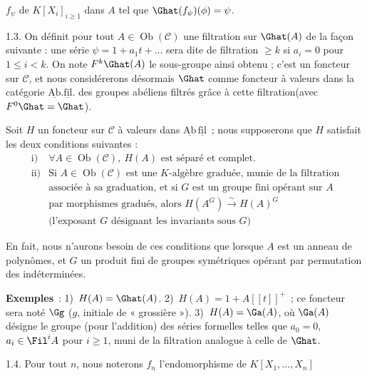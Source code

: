 
\(f_\psi\) de \(K[X_i]_{i\geq 1}\) dans \(A\) tel que \(\Ghat(f_\psi)(\phi)=\psi\).

1.3. On définit pour tout \(A\in\operatorname{Ob}(\mathcal C)\) une filtration sur \(\Ghat(A)\) de la façon suivante : une série \(\psi=1+a_1t+\ldots\) sera dite de filtration \(\geq k\) si \(a_i=0\) pour \(1\leq i<k\). On note \(F^k\Ghat(A)\) le sous-groupe ainsi obtenu ; c'est un foncteur sur \(\mathcal C\), et nous considérerons désormais \(\Ghat\) comme foncteur à valeurs dans la catégorie \(\underline{\mathrm{Ab}}.\underline{\mathrm{fil}}.\) des groupes abéliens filtrés grâce à cette filtration(avec \(F^0\Ghat=\Ghat\)).

Soit \(H\) un foncteur sur \(\mathcal C\) à valeurs dans \(\underline{\mathrm{Ab}}\,\underline{\mathrm{fil}}\)~; nous supposerons que \(H\) satisfait les deux conditions suivantes :
\[
\begin{array}{ll}
\text{i)} & \forall A\in\operatorname{Ob}(\mathcal C),\ H(A)\text{ est séparé et complet}.\\[0.3em]
\text{ii)} & \text{Si }A\in\operatorname{Ob}(\mathcal C)\text{ est une }K\text{-algèbre graduée, munie de la filtration}\\
& \text{associée à sa graduation, et si }G\text{ est un groupe fini opérant sur }A\\
& \text{par morphismes gradués, alors }H(A^G)\xrightarrow{\sim} H(A)^G\\
& \text{(l'exposant }G\text{ désignant les invariants sous }G\text{)}
\end{array}
\]

En fait, nous n'aurons besoin de ces conditions que lorsque \(A\) est un anneau de polynômes, et \(G\) un produit fini de groupes symétriques opérant par permutation des indéterminées.

\textbf{Exemples}~: 1)~\(H(A)=\Ghat(A)\). 2)~\(H(A)=1+A[[t]]^+\)~; ce foncteur sera noté \(\Gg\) (\(g\), initiale de « grossière »). 3)~\(H(A)=\Ga(A)\), où \(\Ga(A)\) désigne le groupe (pour l'addition) des séries formelles telles que \(a_0=0\), \(a_i\in\Fil^i A\) pour \(i\geq 1\), muni de la filtration analogue à celle de \(\Ghat\).

1.4. Pour tout \(n\), nous noterons \(f_n\) l'endomorphisme de \(K[X_1,\ldots,X_n]\)
